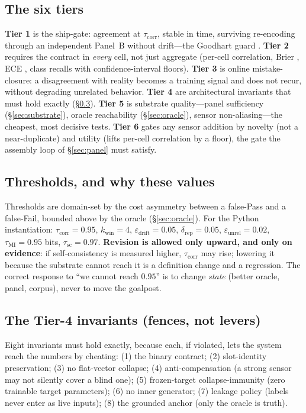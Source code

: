 \documentclass[10pt,twocolumn]{article}
\begin{document}
\subsection{The six tiers}
\textbf{Tier 1} is the ship-gate: agreement at $\tau_{\mathrm{corr}}$, stable in
time, surviving re-encoding through an independent Panel~B without drift---the
Goodhart guard \citep{manheim2018categorizing}. \textbf{Tier 2} requires the
contract in \emph{every} cell, not just aggregate (per-cell correlation, Brier
\citep{brier1950verification}, ECE \citep{guo2017calibration}, class recalls with
confidence-interval floors). \textbf{Tier 3} is online mistake-closure: a
disagreement with reality becomes a training signal and does not recur, without
degrading unrelated behavior. \textbf{Tier 4} are architectural invariants that
must hold exactly (\S\ref{sec:predicate-inv}). \textbf{Tier 5} is substrate
quality---panel sufficiency (\S\ref{sec:substrate}), oracle reachability
(\S\ref{sec:oracle}), sensor non-aliasing---the cheapest, most decisive tests.
\textbf{Tier 6} gates any sensor addition by novelty (not a near-duplicate) and
utility (lifts per-cell correlation by a floor), the gate the assembly loop of
\S\ref{sec:panel} must satisfy.

\subsection{Thresholds, and why these values}
Thresholds are domain-set by the cost asymmetry between a false-\textsf{Pass} and
a false-\textsf{Fail}, bounded above by the oracle (\S\ref{sec:oracle}). For the
Python instantiation: $\tau_{\mathrm{corr}}=0.95$, $k_{\text{win}}=4$,
$\varepsilon_{\text{drift}}=0.05$, $\delta_{\text{rep}}=0.05$,
$\varepsilon_{\text{unrel}}=0.02$, $\tau_{\mathrm{MI}}=0.95$ bits,
$\tau_{\mathrm{sc}}=0.97$. \textbf{Revision is allowed only upward, and only on
evidence}: if self-consistency is measured higher, $\tau_{\mathrm{corr}}$ may
rise; lowering it because the substrate cannot reach it is a definition change and
a regression. The correct response to ``we cannot reach $0.95$'' is to change
\emph{state} (better oracle, panel, corpus), never to move the goalpost.

\subsection{The Tier-4 invariants (fences, not levers)}
\label{sec:predicate-inv}
Eight invariants must hold exactly, because each, if violated, lets the system
reach the numbers by cheating: (1) the binary contract; (2) slot-identity
preservation; (3) no flat-vector collapse; (4) anti-compensation (a strong sensor
may not silently cover a blind one); (5) frozen-target collapse-immunity (zero
trainable target parameters); (6) no inner generator; (7) leakage policy (labels
never enter as live inputs); (8) the grounded anchor (only the oracle is truth).
\end{document}

